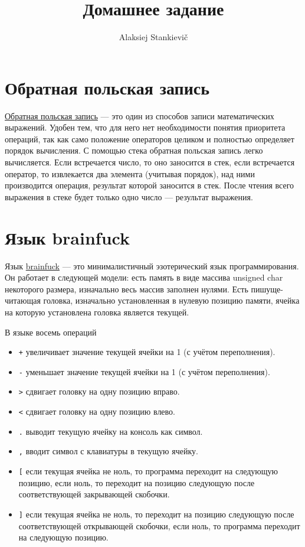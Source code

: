 \documentclass[12pt]{article}
\author{Alaksiej Stankievič}
\title{Домашнее задание}
\begin{document}

\section{Обратная польская запись}

\href{https://ru.wikipedia.org/wiki/%D0%9E%D0%B1%D1%80%D0%B0%D1%82%D0%BD%D0%B0%D1%8F_%D0%BF%D0%BE%D0%BB%D1%8C%D1%81%D0%BA%D0%B0%D1%8F_%D0%B7%D0%B0%D0%BF%D0%B8%D1%81%D1%8C}{Обратная польская запись} 
--- это один из способов записи математических выражений. Удобен тем, что для него нет необходимости понятия приоритета операций, так как само положение операторов целиком и полностью определяет порядок вычисления. С помощью стека обратная польская запись легко вычисляется. Если встречается число, то оно заносится в стек, если встречается оператор, то извлекается два элемента (учитывая порядок), над ними производится операция, результат которой заносится в стек. После чтения всего выражения в стеке будет только одно число --- результат  выражения.

\section{Язык brainfuck}

Язык \href{https://ru.wikipedia.org/wiki/Brainfuck}{brainfuck} --- это минималистичный эзотерический язык программирования. Он работает в следующей модели: есть память в виде массива unsigned char некоторого размера, изначально весь массив заполнен нулями. Есть пишуще-читающая головка, изначально установленная в нулевую позицию памяти, ячейка на которую установлена головка является текущей. 

В языке восемь операций

\begin{itemize}
 \item \verb|+| увеличивает значение текущей ячейки на 1 (с учётом переполнения).
 \item \verb|-| уменьшает значение текущей ячейки на 1 (с учётом переполнения).
 \item \verb|>| сдвигает головку на одну позицию вправо.
 \item \verb|<| сдвигает головку на одну позицию влево.
 \item \verb|.| выводит текущую ячейку на консоль как символ.
 \item \verb|,| вводит символ с клавиатуры в текущую ячейку.
 \item \verb|[| если текущая ячейка не ноль, то программа переходит на следующую позицию, если ноль, то переходит на позицию следующую после соответствующей закрывающей скобочки.
 \item \verb|]| если текущая ячейка не ноль, то переходит на позицию следующую после соответствующей открывающей скобочки, если ноль, то программа переходит на следующую позицию.
\end{itemize}
\end{document}
